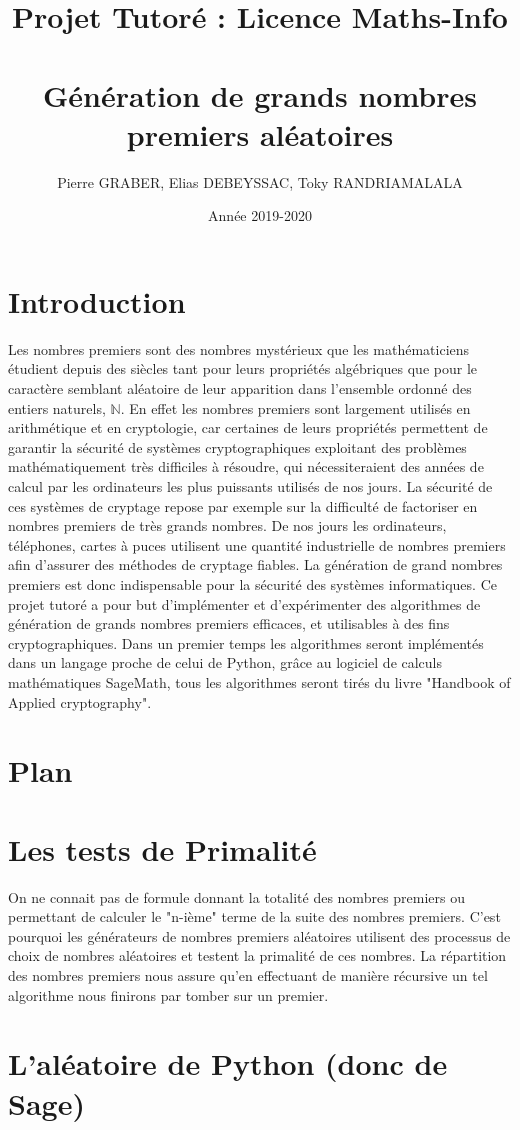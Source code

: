 \documentclass{article}
\title{Projet Tutoré : Licence Maths-Info
\section*{Génération de grands nombres premiers aléatoires}
\date{ Année 2019-2020}
}
\author{Pierre GRABER, Elias DEBEYSSAC, Toky RANDRIAMALALA }
\begin{document}
\maketitle

\section*{Introduction}
Les nombres premiers sont des nombres mystérieux que les mathématiciens étudient depuis des siècles tant pour leurs propriétés algébriques que pour le caractère semblant aléatoire de leur apparition dans l'ensemble ordonné des entiers naturels, $\mathbb{N}$. En effet les nombres premiers sont largement utilisés en arithmétique et en cryptologie, car certaines de leurs propriétés permettent de garantir la sécurité de systèmes cryptographiques exploitant des problèmes mathématiquement très difficiles à résoudre, qui nécessiteraient des années de calcul par les ordinateurs les plus puissants utilisés de nos jours. \newline 
La sécurité de ces systèmes de cryptage repose par exemple sur la difficulté de factoriser en nombres premiers de très grands nombres. De nos jours les ordinateurs, téléphones, cartes à puces utilisent une quantité industrielle de nombres premiers afin d'assurer des méthodes de cryptage fiables. La génération de grand nombres premiers est donc indispensable pour la sécurité des systèmes informatiques. Ce projet tutoré a pour but d'implémenter et d'expérimenter des algorithmes de génération de grands nombres premiers efficaces, et utilisables à des fins cryptographiques. Dans un premier temps les algorithmes seront implémentés dans un langage proche de celui de Python, grâce au logiciel de calculs mathématiques SageMath, tous les algorithmes seront tirés du livre "Handbook of Applied cryptography".

\section*{Plan}
\section*{Les tests de Primalité}
On ne connait pas de formule donnant la totalité des nombres premiers ou permettant de calculer le "n-ième" terme de la suite des nombres premiers. C'est pourquoi les générateurs de nombres premiers aléatoires utilisent des processus de choix de nombres aléatoires et testent la primalité de ces nombres. La répartition des nombres premiers nous assure qu'en effectuant de manière récursive un tel algorithme nous finirons par tomber sur un premier.



\section*{L'aléatoire de Python (donc de Sage)}
 
  
\end{document}
